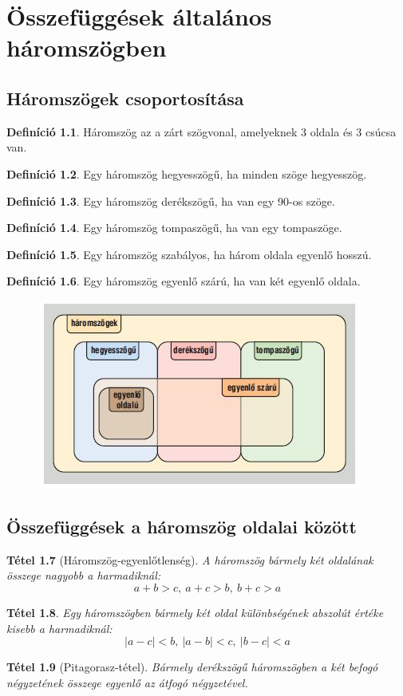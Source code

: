 \documentclass[twoside,12pt]{report}
\newtheorem{theorem}{Tétel}[section]
\theoremstyle{definition}
\newtheorem{definition}[theorem]{Definíció}
\begin{document}
\chapter{Összefüggések általános háromszögben}
\section{Háromszögek csoportosítása}
	\begin{definition}
		Háromszög az a zárt szögvonal, amelyeknek 3 oldala és 3 csúcsa van.
	\end{definition}
	\begin{definition}
		Egy háromszög hegyesszögű, ha minden szöge hegyesszög.
	\end{definition}
	\begin{definition}
		Egy háromszög derékszögű, ha van egy 90\degree-os szöge.
	\end{definition}
	\begin{definition}
		Egy háromszög tompaszögű, ha van egy tompaszöge.
	\end{definition}
	\begin{definition}
		Egy háromszög szabályos, ha három oldala egyenlő hosszú.
	\end{definition}
	\begin{definition}
		Egy háromszög egyenlő szárú, ha van két egyenlő oldala.
	\end{definition}
	\begin{figure}[H]
		\centering
		\includegraphics[width=0.6\linewidth]{Csoport}
	\end{figure}
\section{Összefüggések a háromszög oldalai között}
	\begin{theorem}[Háromszög-egyenlőtlenség]
		A háromszög bármely két oldalának összege nagyobb a harmadiknál:
		\begin{equation*}
			a+b>c,\ a+c>b,\ b+c>a
		\end{equation*}
	\end{theorem}
	\begin{theorem}
		Egy háromszögben bármely két oldal különbségének abszolút értéke kisebb a harmadiknál:
		\begin{equation*}
			|a-c|<b,\ |a-b|<c,\ |b-c|<a
		\end{equation*}
	\end{theorem}
	\begin{theorem}[Pitagorasz-tétel]
		Bármely derékszögű háromszögben a két befogó négyzetének összege egyenlő az átfogó négyzetével.
	\end{theorem}
\end{document}
